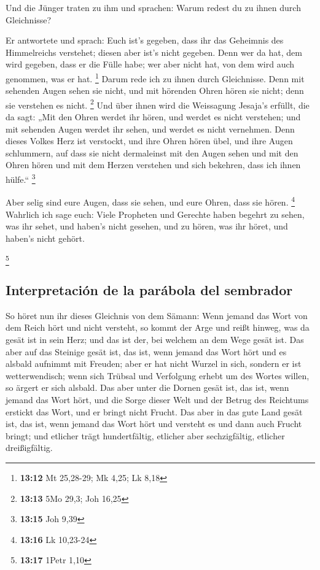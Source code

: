  Und die Jünger traten zu ihm und sprachen: Warum redest
du zu ihnen durch Gleichnisse?

 Er antwortete und sprach: Euch ist's gegeben, dass ihr
das Geheimnis des Himmelreichs verstehet; diesen aber ist's nicht
gegeben.  Denn wer da hat, dem wird gegeben, dass er die
Fülle habe; wer aber nicht hat, von dem wird auch genommen, was er hat.
\footnote{\textbf{13:12} Mt 25,28-29; Mk 4,25; Lk 8,18} 
Darum rede ich zu ihnen durch Gleichnisse. Denn mit sehenden Augen sehen
sie nicht, und mit hörenden Ohren hören sie nicht; denn sie verstehen es
nicht. \footnote{\textbf{13:13} 5Mo 29,3; Joh 16,25}  Und
über ihnen wird die Weissagung Jesaja's erfüllt, die da sagt: „Mit den
Ohren werdet ihr hören, und werdet es nicht verstehen; und mit sehenden
Augen werdet ihr sehen, und werdet es nicht vernehmen. 
Denn dieses Volkes Herz ist verstockt, und ihre Ohren hören übel, und
ihre Augen schlummern, auf dass sie nicht dermaleinst mit den Augen
sehen und mit den Ohren hören und mit dem Herzen verstehen und sich
bekehren, dass ich ihnen hülfe.`` \footnote{\textbf{13:15} Joh 9,39}

 Aber selig sind eure Augen, dass sie sehen, und eure
Ohren, dass sie hören. \footnote{\textbf{13:16} Lk 10,23-24}
 Wahrlich ich sage euch: Viele Propheten und Gerechte
haben begehrt zu sehen, was ihr sehet, und haben's nicht gesehen, und zu
hören, was ihr höret, und haben's nicht gehört.

\footnote{\textbf{13:17} 1Petr 1,10}

\hypertarget{interpretaciuxf3n-de-la-paruxe1bola-del-sembrador}{%
\subsection{Interpretación de la parábola del
sembrador}\label{interpretaciuxf3n-de-la-paruxe1bola-del-sembrador}}

 So höret nun ihr dieses Gleichnis von dem Sämann:
 Wenn jemand das Wort von dem Reich hört und nicht
versteht, so kommt der Arge und reißt hinweg, was da gesät ist in sein
Herz; und das ist der, bei welchem an dem Wege gesät ist.
 Das aber auf das Steinige gesät ist, das ist, wenn
jemand das Wort hört und es alsbald aufnimmt mit Freuden;
 aber er hat nicht Wurzel in sich, sondern er ist
wetterwendisch; wenn sich Trübsal und Verfolgung erhebt um des Wortes
willen, so ärgert er sich alsbald.  Das aber unter die
Dornen gesät ist, das ist, wenn jemand das Wort hört, und die Sorge
dieser Welt und der Betrug des Reichtums erstickt das Wort, und er
bringt nicht Frucht.  Das aber in das gute Land gesät
ist, das ist, wenn jemand das Wort hört und versteht es und dann auch
Frucht bringt; und etlicher trägt hundertfältig, etlicher aber
sechzigfältig, etlicher dreißigfältig.

